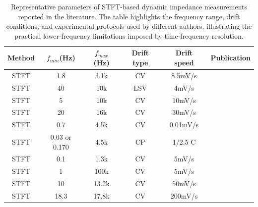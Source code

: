 \begin{table}[h]
    \centering
    \begin{tabular}{cccccc}
        \toprule
        Method & $f_{min}$(Hz) & $f_{max} $(Hz) & Drift type & Drift speed & Publication\\
        \midrule
        STFT & 1.8 & 3.1k & CV & 8.5mV/s & \cite{popkirovInsituImpedanceMeasurements1995}\\
        STFT & 40 & 10k & LSV & 4mV/s & \cite{waltersWeakAdsorptionAnions2001}\\
        STFT & 5 & 10k & CV & 10mV/s & \cite{garlandKineticAnalysisElectrosorption2002}\\
        STFT & 20 & 16k & CV & 30mV/s & \cite{darowickiImpedanceCharacterizationProcess2004}\\
        STFT & 0.7 & 4.5k & CV & 0.01mV/s & \cite{slepskiElectrochemicalImpedanceStudies2010}\\
        STFT & 0.03 or 0.170 & 4.5k & CP & 1/2.5 C & \cite{slepskiApplicationElectrochemicalImpedance2013}\\
        STFT & 0.1 & 1.3k & CV & 5mV/s & \cite{sacciDynamicElectrochemicalImpedance2009}\\
        STFT & 1 & 100k & CV & 5mV/s & \cite{holmUnderstandingReactionMechanisms2018}\\
        STFT & 10 & 13.2k & CV & 50mV/s & \cite{pajkossyDynamicElectrochemicalImpedance2019}\\
        STFT & 18.3 & 17.8k & CV & 200mV/s & \cite{pajkossyConnectionCVsImpedance2020}\\
        \bottomrule
    \end{tabular}
    \caption{Representative parameters of STFT-based dynamic impedance measurements reported in the literature.
    The table highlights the frequency range, drift conditions, and experimental protocols used by different authors, illustrating the practical lower-frequency limitations imposed by time-frequency resolution.}
    \label{tab:literature-parameters-stft}
\end{table}

